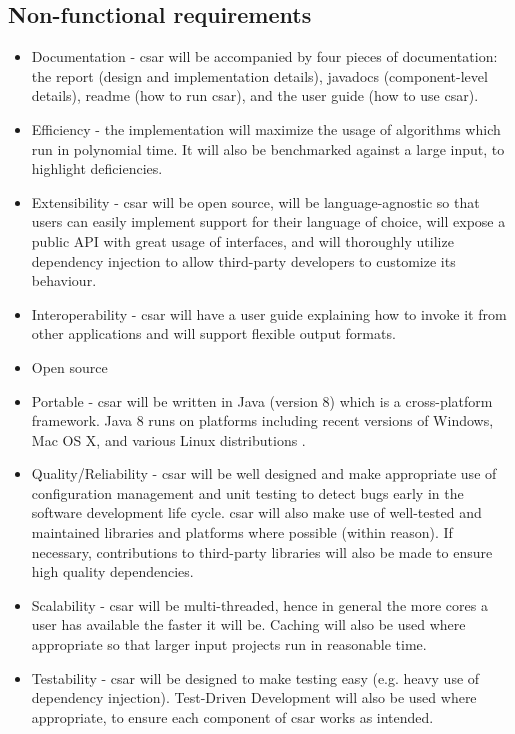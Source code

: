 \documentclass[12pt, letterpaper]{article}
\begin{document}
\subsection{Non-functional requirements}
\begin{itemize}
  \item Documentation - csar will be accompanied by four pieces of documentation: the report (design and implementation details), javadocs (component-level details), readme (how to run csar), and the user guide (how to use csar).
  \item Efficiency - the implementation will maximize the usage of algorithms which run in polynomial time.
  It will also be benchmarked against a large input, to highlight deficiencies.
  \item Extensibility - csar will be open source, will be language-agnostic so that users can easily implement support for their language of choice, will expose a public API with great usage of interfaces, and will thoroughly utilize dependency injection to allow third-party developers to customize its behaviour.
  \item Interoperability - csar will have a user guide explaining how to invoke it from other applications and will support flexible output formats.
  \item Open source
  \item Portable - csar will be written in Java (version 8) which is a cross-platform framework.
  Java 8 runs on platforms including recent versions of Windows, Mac OS X, and various Linux distributions \autocite{javasysreqs}.
  \item Quality/Reliability - csar will be well designed and make appropriate use of configuration management and unit testing to detect bugs early in the software development life cycle.
  csar will also make use of well-tested and maintained libraries and platforms where possible (within reason).
  If necessary, contributions to third-party libraries will also be made to ensure high quality dependencies.
  \item Scalability - csar will be multi-threaded, hence in general the more cores a user has available the faster it will be.
  Caching will also be used where appropriate so that larger input projects run in reasonable time.
  \item Testability - csar will be designed to make testing easy (e.g. heavy use of dependency injection).
  Test-Driven Development will also be used where appropriate, to ensure each component of csar works as intended.
\end{itemize}
\end{document}
